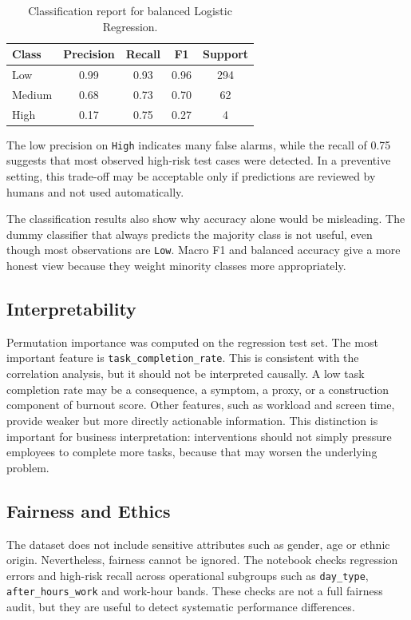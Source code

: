 \documentclass[conference]{IEEEtran}
\begin{document}
\begin{table}[h]
\centering
\caption{Classification report for balanced Logistic Regression.}
\label{tab:classification}
\begin{tabular}{lcccc}
\toprule
Class & Precision & Recall & F1 & Support \\
\midrule
Low & 0.99 & 0.93 & 0.96 & 294 \\
Medium & 0.68 & 0.73 & 0.70 & 62 \\
High & 0.17 & 0.75 & 0.27 & 4 \\
\bottomrule
\end{tabular}
\end{table}

The low precision on \texttt{High} indicates many false alarms, while the recall
of 0.75 suggests that most observed high-risk test cases were detected. In a
preventive setting, this trade-off may be acceptable only if predictions are
reviewed by humans and not used automatically.

The classification results also show why accuracy alone would be misleading.
The dummy classifier that always predicts the majority class is not useful, even
though most observations are \texttt{Low}. Macro F1 and balanced accuracy give a
more honest view because they weight minority classes more appropriately.

\subsection{Interpretability}

Permutation importance was computed on the regression test set. The most
important feature is \texttt{task\_completion\_rate}. This is consistent with
the correlation analysis, but it should not be interpreted causally. A low task
completion rate may be a consequence, a symptom, a proxy, or a construction
component of burnout score. Other features, such as workload and screen time,
provide weaker but more directly actionable information. This distinction is
important for business interpretation: interventions should not simply pressure
employees to complete more tasks, because that may worsen the underlying
problem.

\subsection{Fairness and Ethics}

The dataset does not include sensitive attributes such as gender, age or ethnic
origin. Nevertheless, fairness cannot be ignored. The notebook checks regression
errors and high-risk recall across operational subgroups such as
\texttt{day\_type}, \texttt{after\_hours\_work} and work-hour bands. These
checks are not a full fairness audit, but they are useful to detect systematic
performance differences.
\end{document}
